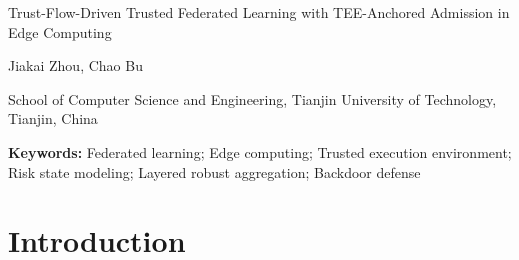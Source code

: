 \documentclass[11pt, a4paper]{article}
\begin{document}
\begin{center}
    {\Large Trust-Flow-Driven Trusted Federated Learning with TEE-Anchored Admission in Edge Computing\par}
    \vspace{10pt}
    {Jiakai Zhou, Chao Bu\par}
    \vspace{2pt}
    {School of Computer Science and Engineering, Tianjin University of Technology, Tianjin, China\par}
\end{center}

\begin{abstract}
        Federated learning must distinguish an update produced by an admissible
        execution from an update that is useful and semantically safe under
        Non-IID data. A static trusted-execution gate cannot answer the second
        question, whereas a single update-quality threshold can remove legitimate
        long-tail clients. This paper presents Trust Flow, a system-level
        decision framework that keeps execution credibility, current update
        content, long-term utility, and short-term risk as separate evidence
        streams until aggregation. A TEE-anchored trusted management and
        attestation agent (TMAA) supplies admission evidence; an explicit Kalman
        recursion and a dual-stream Beta/EMA state model define cold-start and
        cross-round behavior; and a layer-wise rule performs risk-dependent
        clipping with data-size-aware survivor re-normalization. The evaluation
        uses two Intel/AMD TEE-capable hardware configurations, Flower/PyTorch,
        CIFAR-10, 20 admitted clients, six concurrent attack behaviors, five
        seeds per platform, and a 30\% malicious setting. Targeted ASR is
        macro-averaged over trigger, clean-label, and semantic attacks, whereas
        untargeted attacks are evaluated through clean accuracy, loss, and state
        transitions. Under the stated protocol, Trust Flow reaches 92.31\%
        clean accuracy, 10.21\% targeted ASR, and no permanent false ban in the
        tested runs.
\end{abstract}

\noindent\textbf{Keywords:} Federated learning; Edge computing; Trusted execution environment; Risk state modeling; Layered robust aggregation; Backdoor defense

\section{Introduction}
\end{document}
